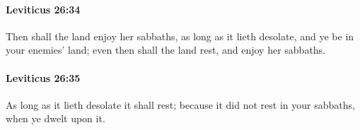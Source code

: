 		\paragraph{Leviticus 26:34} %
			\label{LEVITICUS-26-34}

			Then shall the land enjoy her sabbaths, as long as it lieth desolate, and ye be in your enemies’ land; even then shall the land rest, and enjoy her sabbaths.


		\paragraph{Leviticus 26:35} %
			\label{LEVITICUS-26-35}

			As long as it lieth desolate it shall rest; because it did not rest in your sabbaths, when ye dwelt upon it.


